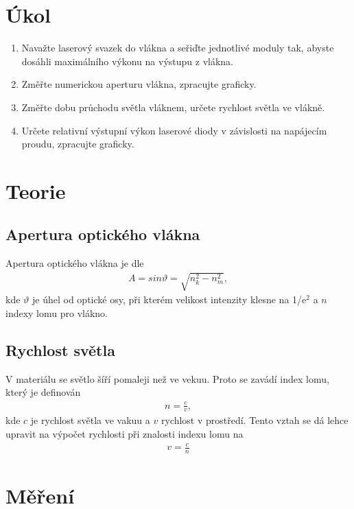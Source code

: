 \documentclass[a4paper,12pt]{article}
\begin{document}
\newcommand{\st}{^{\circ}}
\newcommand{\RJ}{\mbox{RJ}}
\newcommand{\mV}{\mbox{m}/\mbox{V}^2}

\section{Úkol}
\begin{enumerate}
    \item Navažte laserový svazek do vlákna a seřiďte jednotlivé moduly tak, abyste dosáhli maximálního výkonu na výstupu z vlákna.
    \item Změřte numerickou aperturu vlákna, zpracujte graficky.
    \item Změřte dobu průchodu světla vláknem, určete rychlost světla ve vlákně.
    \item Určete relativní výstupní výkon laserové diody v závislosti na napájecím proudu, zpracujte graficky. 
\end{enumerate}

\section{Teorie}
\subsection{Apertura optického vlákna}
Apertura optického vlákna je dle \cite{text}
\begin{eqnarray}
A=sin \vartheta = \sqrt{n_k^2-n_m^2},
\label{A}
\end{eqnarray}
kde $\vartheta$ je úhel od optické osy, při kterém velikost intenzity klesne na 1/e$^2$ a $n$ indexy lomu pro vlákno.

\subsection{Rychlost světla}
V materiálu se světlo šíří pomaleji než ve vekuu. Proto se zavádí index lomu, který je definován
\begin{eqnarray}
n=\frac{c}{v},
\end{eqnarray}
kde $c$ je rychlost světla ve vakuu a $v$ rychlost v prostředí. Tento vztah se dá lehce upravit na výpočet rychlosti při znalosti indexu lomu na
\begin{eqnarray}
v=\frac{c}{n}
\end{eqnarray}

\section{Měření}
\end{document}
